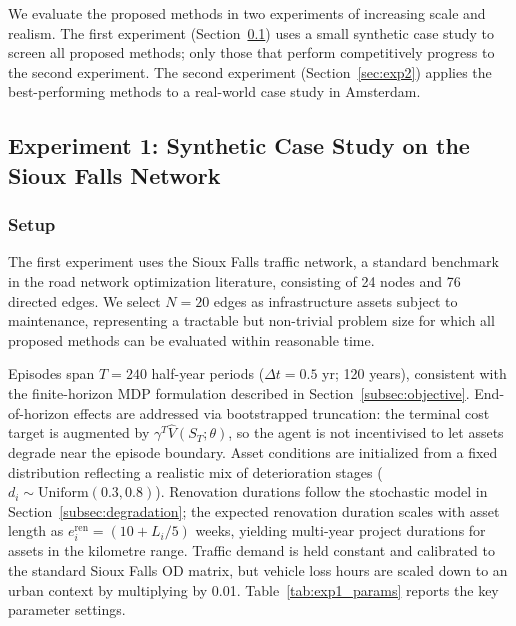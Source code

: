 \documentclass[3p, twocolumn]{elsarticle}
\begin{document}
We evaluate the proposed methods in two experiments of increasing scale and realism. The first experiment (Section~\ref{sec:exp1}) uses a small synthetic case study to screen all proposed methods; only those that perform competitively progress to the second experiment. The second experiment (Section~\ref{sec:exp2}) applies the best-performing methods to a real-world case study in Amsterdam.

\subsection{Experiment 1: Synthetic Case Study on the Sioux Falls Network}
\label{sec:exp1}

\subsubsection{Setup}

The first experiment uses the Sioux Falls traffic network, a standard benchmark in the road network optimization literature, consisting of 24 nodes and 76 directed edges. We select $N = 20$ edges as infrastructure assets subject to maintenance, representing a tractable but non-trivial problem size for which all proposed methods can be evaluated within reasonable time.

Episodes span $T = 240$ half-year periods ($\Delta t = 0.5$ yr; 120 years), consistent with the finite-horizon MDP formulation described in Section~\ref{subsec:objective}. End-of-horizon effects are addressed via bootstrapped truncation: the terminal cost target is augmented by $\gamma^{T} \hat{V}(S_{T}; \theta)$, so the agent is not incentivised to let assets degrade near the episode boundary. Asset conditions are initialized from a fixed distribution reflecting a realistic mix of deterioration stages ($d_i \sim \mathrm{Uniform}(0.3, 0.8)$). Renovation durations follow the stochastic model in Section~\ref{subsec:degradation}; the expected renovation duration scales with asset length as $e_i^{\text{ren}} = (10 + L_i / 5)$ weeks, yielding multi-year project durations for assets in the kilometre range. Traffic demand is held constant and calibrated to the standard Sioux Falls OD matrix, but vehicle loss hours are scaled down to an urban context by multiplying by 0.01. Table~\ref{tab:exp1_params} reports the key parameter settings.
\end{document}
